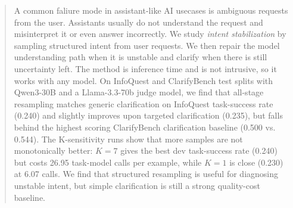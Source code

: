 \begin{abstract}
A common faliure mode in assistant-like AI usecases is ambiguous requests from the user. Assistants usually do not understand the request and misinterpret it or even answer incorrectly. We study \emph{intent stabilization} by sampling structured intent from user requests. We then repair the model understanding path when it is unstable and clarify when there is still uncertainty left. The method is inference time and is not intrusive, so it works with any model. On InfoQuest and ClarifyBench test splits with Qwen3-30B and a Llama-3.3-70b judge model, we find that all-stage resampling matches generic clarification on InfoQuest task-success rate (0.240) and slightly improves upon targeted clarification (0.235), but falls behind the highest scoring ClarifyBench clarification baseline (0.500 vs. 0.544). The K-sensitivity runs show that more samples are not monotonically better: \(K=7\) gives the best dev task-success rate (0.240) but costs 26.95 task-model calls per example, while \(K=1\) is close (0.230) at 6.07 calls. We find that structured resampling is useful for diagnosing unstable intent, but simple clarification is still a strong quality-cost baseline.
\end{abstract}